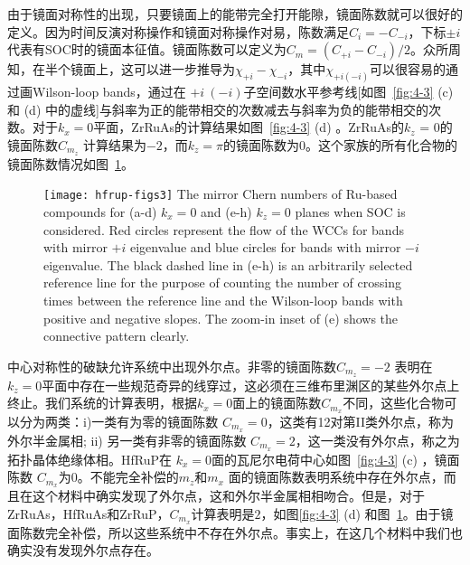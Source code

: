     
由于镜面对称性的出现，只要镜面上的能带完全打开能隙，镜面陈数就可以很好的定义。因为时间反演对称操作和镜面对称操作对易，陈数满足$C_i =  -C_{-i}$，下标$\pm i$代表有SOC时的镜面本征值。镜面陈数可以定义为$C_m = (C_{+i}-C_{-i})/2$。众所周知，在半个镜面上，这可以进一步推导为$\chi_{+i}-\chi_{-i}$，其中$\chi_{+i(-i)}$可以很容易的通过画Wilson-loop bands，通过在 $+i~(-i)$子空间数水平参考线[如图~\ref{fig:4-3} (c) 和 (d) 中的虚线]与斜率为正的能带相交的次数减去与斜率为负的能带相交的次数。对于$k_x = 0$平面，ZrRuAs的计算结果如图~\ref{fig:4-3} (d) 。ZrRuAs的$k_z$ = 0的镜面陈数$C_{m_z}$ 计算结果为$-2$，而$k_z =\pi$的镜面陈数为0。这个家族的所有化合物的镜面陈数情况如图~\ref{hfrup-fig:s3}。

\begin{figure}[!htb]
    \centering
    \texttt{[image: hfrup-figs3]}
    {
    The mirror Chern numbers of Ru-based compounds  for (a-d) $k_x=0$ and (e-h) $k_z=0$ planes when SOC is considered. Red circles represent the flow of the WCCs for bands with mirror $+i$  eigenvalue and blue circles for bands with mirror $-i$  eigenvalue.
    The black dashed line in (e-h) is an arbitrarily selected reference line for the purpose of counting the number of crossing times between the reference line and the Wilson-loop bands with positive and negative slopes. The zoom-in inset of (e) shows the connective pattern clearly. ~\citep{qian2019npj}
    }\label{hfrup-fig:s3}
\end{figure}
    
    
中心对称性的破缺允许系统中出现外尔点。非零的镜面陈数$C_{m_z} =-2$ 表明在$ k_z = 0 $平面中存在一些规范奇异的线穿过\citep{bernevig2015s}，这必须在三维布里渊区的某些外尔点上终止。我们系统的计算表明，根据$k_x=0$面上的镜面陈数$C_{m_x}$不同，这些化合物可以分为两类：i)一类有为零的镜面陈数 $C_{m_x} =0$，这类有12对第II类外尔点，称为外尔半金属相; ii) 另一类有非零的镜面陈数 $C_{m_x} =2$，这一类没有外尔点，称之为拓扑晶体绝缘体相。HfRuP在 $k_x=0$面的瓦尼尔电荷中心如图~\ref{fig:4-3} (c) ，镜面陈数 $C_{m_x}$为0。不能完全补偿的$m_z$和$m_x$ 面的镜面陈数表明系统中存在外尔点，而且在这个材料中确实发现了外尔点，这和外尔半金属相相吻合。但是，对于ZrRuAs，HfRuAs和ZrRuP，$C_{m_x}$计算表明是$2$，如图\ref{fig:4-3} (d) 和图~\ref{hfrup-fig:s3}。由于镜面陈数完全补偿，所以这些系统中不存在外尔点。事实上，在这几个材料中我们也确实没有发现外尔点存在。

